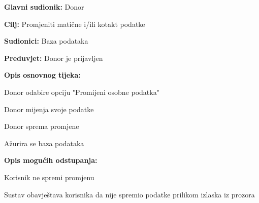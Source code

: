 \eject 
\noindent {}
					\begin{packed_item}
	
						\item \textbf{Glavni sudionik: }Donor
						\item \textbf{Cilj:} Promjeniti matične i/ili kotakt podatke
						\item \textbf{Sudionici:} Baza podataka
						\item \textbf{Preduvjet:} Donor je prijavljen
						\item \textbf{Opis osnovnog tijeka:}
						
						\item[] \begin{packed_enum}
	
							\item Donor odabire opciju "Promijeni osobne podatka"
							\item Donor mijenja svoje podatke
							\item Donor sprema promjene
							\item Ažurira se baza podataka
							
						\end{packed_enum}

						\item  \textbf{Opis mogućih odstupanja:}
						
						\item[] \begin{packed_item}
	
							\item[2.a] Korisnik ne spremi promjenu
							\item[] \begin{packed_enum}
								
								\item  Sustav obavještava korisnika da nije spremio podatke prilikom izlaska iz prozora

								
									\end{packed_enum}
								\end{packed_item}
					\end{packed_item}
\noindent {}
